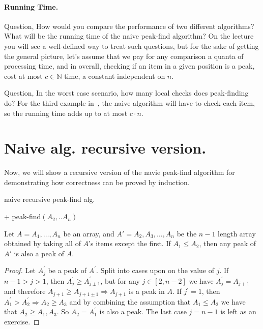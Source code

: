 \paragraph{Running Time.} 
Question, How would you compare the performance of two different algorithms? What will be the running time of the naive peak-find algorithm? On the lecture you will see a well-defined way to treat such questions, but for the sake of getting the general picture, let's assume that we pay for any comparison a quanta of processing time, and in overall, checking if an item in a given position is a peak, cost at most $c\in \mathbb{N}$ time, a constant independent on $n$.

Question, In the worst case scenario, how many local checks does peak-finding do? For the third example in~, the naive algorithm will have to check each item, so the running time adds up to at most $c \cdot n$.

\section{Naive alg. recursive version.}
Now, we will show a recursive version of the navie peak-find algorithm for demonstrating how correctness can be proved by induction. 
\begin{algorithm}
\caption{naive recursive peak-find alg.}
  + peak-find$(A_{2}, .. A_{n})$
 \end{algorithm}

 \begin{claim} \label{claim:subarray} 
Let $A = A_1, \dots, A_n$ be an array, and $A' = A_2, A_3, \dots, A_n$ be the $n-1$ length array obtained by taking all of $A$'s items except the first. If $A_1 \le A_2$, then any peak of $A'$ is also a peak of $A$.
\end{claim}
\begin{proof} 
Let $A^{\prime}_{j}$ be a peak of $A^{\prime}$. Split into cases upon on the value of $j$. If $n-1 > j > 1$, then $A^{\prime}_{j} \ge A^{\prime}_{j \pm 1}$, but for any $j \in [2, n-2]$ we have $A^{\prime}_{j} = A_{j+1}$ and therefore $A_{j+1} \ge A_{j+1 \pm 1} \Rightarrow A_{j+1}$ is a peak in $A$. If $j^{\prime} = 1$, then $A^{\prime}_{1} > A^{\prime}_{2} \Rightarrow A_{2} \ge A_{3}$ and by combining the assumption that $A_{1} \le A_{2}$ we have that $A_{2} \ge A_{1}, A_{3}$. So $A_{2} = A^{\prime}_{1}$ is also a peak. The last case $j = n-1$ is left as an exercise.
\end{proof}

